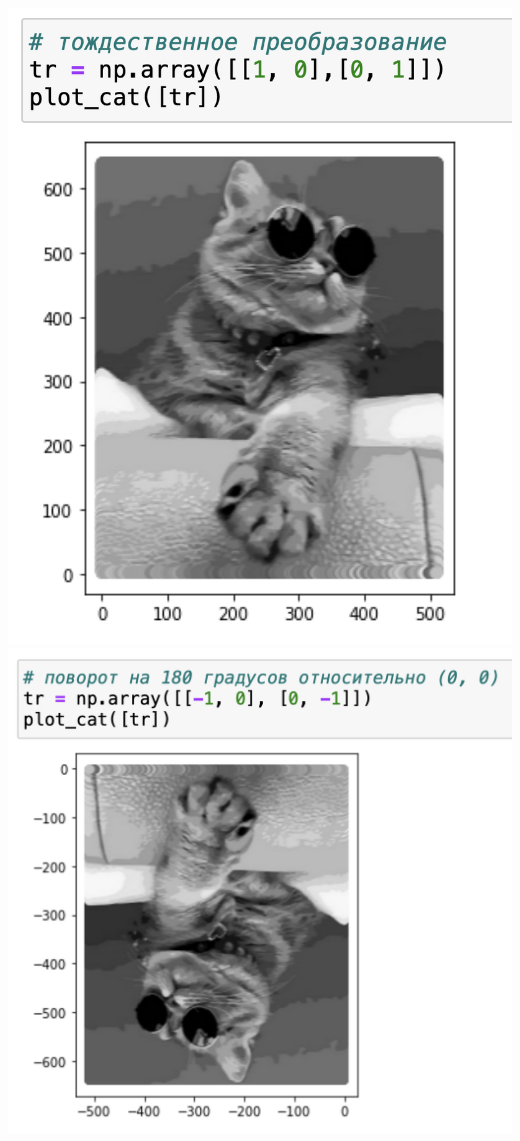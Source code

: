 \documentclass[a4paper, 12pt]{article}
\begin{document}
\begin{spacing}{1.5}
\includegraphics[scale=0.45]{id.png}
\includegraphics[scale=0.45]{rotation.png}


\end{spacing}
\end{document}
